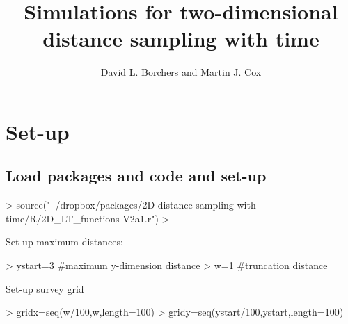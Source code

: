 \documentclass{article}
\begin{document}


\title{Simulations for two-dimensional distance sampling with time}
\author{David L. Borchers and Martin J. Cox}
\maketitle
\section{Set-up}
\subsection{Load packages and code and set-up}
\begin{Schunk}
\begin{Sinput}
> source("~/dropbox/packages/2D distance sampling with time/R/2D_LT_functions V2a1.r")
> 
\end{Sinput}
\end{Schunk}
Set-up maximum distances:
\begin{Schunk}
\begin{Sinput}
> ystart=3 #maximum y-dimension distance
> w=1  #truncation distance
\end{Sinput}
\end{Schunk}
Set-up survey grid
\begin{Schunk}
\begin{Sinput}
> gridx=seq(w/100,w,length=100)
> gridy=seq(ystart/100,ystart,length=100)
\end{Sinput}
\end{Schunk}
\end{document}
